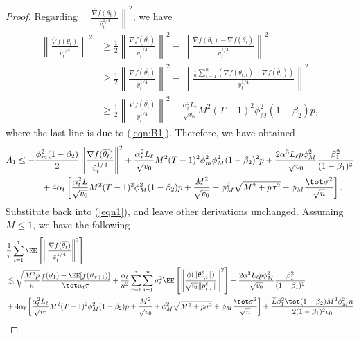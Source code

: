 \documentclass[manuscript,screen,review]{acmart}
\begin{document}
\begin{proof}
Regarding $\left\| \frac{\overline{\nabla}f(\theta_t)}{\hat v_t^{1/4}} \right\|^2$, we have
\begin{align*}
\left\| \frac{\overline{\nabla}f(\theta_t)}{\hat v_t^{1/4}} \right\|^2 & \geq \frac{1}{2} \left\| \frac{\nabla f(\overline{\theta_t})}{\hat v_t^{1/4}} \right\|^2 - \left\| \frac{\overline{\nabla}f(\theta_t)- \nabla f(\overline{\theta_t})}{\hat v_t^{1/4}} \right\|^2\\
& \geq \frac{1}{2} \left\| \frac{\nabla f(\overline{\theta_t})}{\hat v_t^{1/4}} \right\|^2 - \left\| \frac{\frac{1}{n}\sum_{i=1}^n (\nabla f(\theta_{t,i})-\nabla f(\bar\theta_i))}{\hat v_t^{1/4}} \right\|^2 \\
&\geq \frac{1}{2} \left\| \frac{\nabla f(\overline{\theta_t})}{\hat v_t^{1/4}} \right\|^2 - \frac{\alpha_t^2 L_\ell}{\sqrt{v_0}} M^2 (T-1)^2 \phi_M^2 (1-\beta_2)p,
\end{align*}
where the last line is due to (\ref{eqn:B1}). Therefore, we have obtained
\begin{align*}
    A_1&\leq -\frac{\phi_m^2(1-\beta_2)}{2}\left\| \frac{\nabla f(\overline{\theta_t})}{\hat v_t^{1/4}} \right\|^2+\frac{\alpha_r^2 L_\ell}{\sqrt{v_0}} M^2 (T-1)^2 \phi_m^2\phi_M^2 (1-\beta_2)^2p+\frac{2\alpha^3 L_\ell p\phi_M^2}{ \sqrt{v_0}}\frac{\beta_1^2}{(1-\beta_1)^2} \\
    &\hspace{0.4in}  + 4\alpha_t \left[ \frac{\alpha_t^2 L}{\sqrt{v_0}}  M^2 (T-1)^2 \phi_M^2 (1-\beta_2)p + \frac{M^2}{\sqrt{v_0}}+\phi_M^2\sqrt{M^2+p\sigma^2} + \phi_M \frac{\tot \sigma^2}{\sqrt{n}}\right].
\end{align*}
Substitute back into (\ref{eqn1}), and leave other derivations unchanged. Assuming $M\leq 1$, we have the following
\begin{align*}
    &\frac{1}{\tau}\sum_{t=1}^\tau  \EE\left[ \left\| \frac{\nabla f(\overline{\theta_t})}{\hat v_t^{1/4}}   \right \|^2 \right] \\
    & \lesssim  \sqrt{\frac{M^2 p}{n}} \frac{ f(\bar{\vartheta}_1)  - \EE[ f(\bar{\vartheta}_{\tau+1})]}{\tot \alpha_t \tau}+   \frac{\alpha_t}{n^2}  \sum_{r=1}^\tau  \sum_{i = 1}^n  \sigma_i^2 \EE\left[ \left\|\frac{\phi(\|\theta_{r,i}^{\ell}\|)}{\sqrt{v_t} \|p_{r,i}^{\ell}\|} \right\|^2 \right] +\frac{2\alpha^3 L_\ell p\phi_M^2}{ \sqrt{v_0}}\frac{\beta_1^2}{(1-\beta_1)^2} \nonumber\\
   &   +4\alpha_t \left[ \frac{\alpha_t^2 L_\ell}{\sqrt{v_0}}  M^2 (T-1)^2 \phi_M^2 (1-\beta_2)p + \frac{M^2}{\sqrt{v_0}}+\phi_M^2\sqrt{M^2+p\sigma^2} + \phi_M \frac{\tot \sigma^2}{\sqrt{n}}\right] + \frac{ \overline{L}\beta_1^2\tot(1-\beta_2)M^2 \phi^2_M n}{2(1-\beta_1)^2 v_0}   \nonumber \\

\end{align*}
\end{proof}
\end{document}
